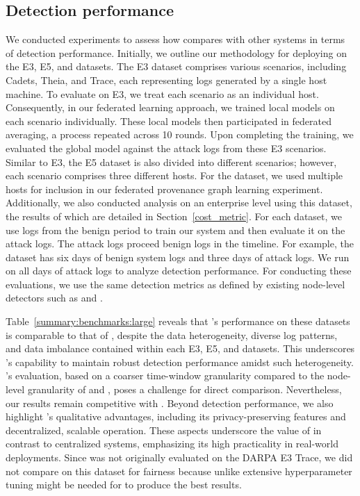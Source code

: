  \subsection{Detection performance}
 We conducted experiments to assess how \Sys compares with other systems in terms of detection performance. Initially, we outline our methodology for deploying \Sys on the \darpa E3, E5, and \optc datasets. The E3 dataset comprises various scenarios, including Cadets, Theia, and Trace, each representing logs generated by a single host machine. To evaluate \Sys on E3, we treat each scenario as an individual host. Consequently, in our federated learning approach, we trained local \gnnshort models on each scenario individually. These local models then participated in federated averaging, a process repeated across 10 rounds. Upon completing the training, we evaluated the global \gnnshort model against the attack logs from these E3 scenarios. Similar to E3, the E5 dataset is also divided into different scenarios; however, each scenario comprises three different hosts. For the \optc dataset, we used multiple hosts for inclusion in our federated provenance graph learning experiment. Additionally, we also conducted analysis on an enterprise level using this dataset, the results of which are detailed in Section~\ref{cost_metric}. For each dataset, we use logs from the benign period to train our system and then evaluate it on the attack logs. The attack logs proceed benign logs in the timeline. For example, the \optc dataset has six days of benign system logs and three days of attack logs. We run \Sys on all days of attack logs to analyze detection performance. For conducting these evaluations, we use the same detection metrics as defined by existing node-level detectors such as \threatrace and \flash.

 Table~\ref{summary:benchmarks:large} reveals that \Sys's performance on these datasets is comparable to that of \flash, despite the data heterogeneity, diverse log patterns, and data imbalance contained within each E3, E5, and \optc datasets. This underscores \Sys's capability to maintain robust detection performance amidst such heterogeneity. \kairos's evaluation, based on a coarser time-window granularity compared to the node-level granularity of \flash and \Sys, poses a challenge for direct comparison. Nevertheless, our results remain competitive with \kairos. Beyond detection performance, we also highlight \Sys's qualitative advantages, including its privacy-preserving features and decentralized, scalable operation. These aspects underscore the value of \Sys in contrast to centralized systems, emphasizing its high practicality in real-world deployments. Since \kairos was not originally evaluated on the DARPA E3 Trace, we did not compare \kairos on this dataset for fairness because unlike \flash extensive hyperparameter tuning might be needed for \kairos to produce the best results.

